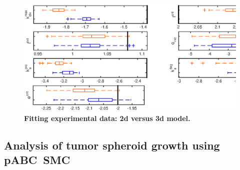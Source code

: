 \documentclass[10pt,letterpaper]{article}
\begin{document}
\begin{figure}[htbp]
\includegraphics[width=\textwidth]{Data/TumorXXXdGCKI67ECMindependentBoxplots}
\caption{{\bf Fitting experimental data: 2d versus 3d model.}
}
\label{fig:exp2dvs3d}
\end{figure}

\subsection*{Analysis of tumor spheroid growth using pABC~SMC}

\end{document}
